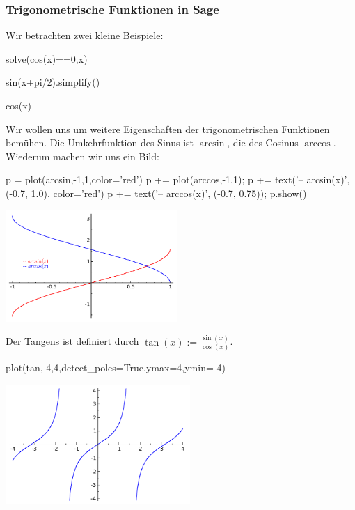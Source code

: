 \documentclass[fontsize=12pt,paper=a4,twoside,bibtotoc,idxtotoc,
liststotoc,pagesize,BCOR1.2cm,DIV15,chapterprefix,pagesize=pdftex]{scrbook}
\theoremstyle{plain}
\theoremstyle{definition}
\theoremstyle{remark}
\begin{document}
\subsubsection{Trigonometrische Funktionen in Sage}
Wir betrachten zwei kleine Beispiele:
\begin{sagein}
solve(cos(x)==0,x)
\end{sagein}
\begin{sageout}
[x == 1/2*pi]
\end{sageout}
\begin{sagein}
sin(x+pi/2).simplify()
\end{sagein}
\begin{sageout}
cos(x)
\end{sageout}
Wir wollen uns um weitere Eigenschaften der trigonometrischen Funktionen bemühen.
Die Umkehrfunktion des Sinus ist $\arcsin$, die des Cosinus $\arccos$. Wiederum machen wir uns ein Bild: 
\begin{sagein}
p = plot(arcsin,-1,1,color='red')
p += plot(arccos,-1,1); 
p += text('-- arcsin(x)', (-0.7, 1.0), color='red')
p += text('-- arccos(x)', (-0.7, 0.75)); p.show()
\end{sagein}
\begin{center}
\includegraphics[width=6.5cm]{arcsinarccos.pdf}
\end{center}
Der Tangens ist definiert durch
$\tan(x) :=\frac{\sin(x)}{\cos(x)}$.
\begin{sagein}
plot(tan,-4,4,detect_poles=True,ymax=4,ymin=-4)
\end{sagein}
\begin{center}
\includegraphics[width=7cm]{tan.pdf}
\end{center}
\end{document}
